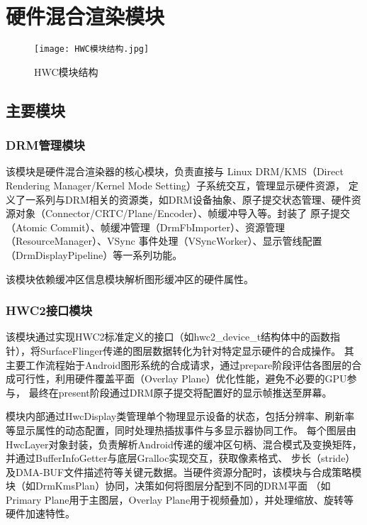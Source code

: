 \section{硬件混合渲染模块}

\begin{figure}[h]
  \centering
  \texttt{[image: HWC模块结构.jpg]}
  \caption{HWC模块结构}
  \label{fig:HWC模块结构}
\end{figure}

\subsection{主要模块}

\subsubsection{DRM管理模块}
该模块是硬件混合渲染器的核心模块，负责直接与 Linux DRM/KMS（Direct Rendering Manager/Kernel Mode Setting）子系统交互，管理显示硬件资源，
定义了一系列与DRM相关的资源类，如DRM设备抽象、原子提交状态管理、硬件资源对象（Connector/CRTC/Plane/Encoder）、帧缓冲导入等。封装了
原子提交（Atomic Commit）、帧缓冲管理（DrmFbImporter）、资源管理（ResourceManager）、VSync 事件处理（VSyncWorker）、显示管线配置（DrmDisplayPipeline）等一系列功能。

该模块依赖缓冲区信息模块解析图形缓冲区的硬件属性。

\subsubsection{HWC2接口模块}
该模块通过实现HWC2标准定义的接口（如hwc2\_device\_t结构体中的函数指针），将SurfaceFlinger传递的图层数据转化为针对特定显示硬件的合成操作。
其主要工作流程始于Android图形系统的合成请求，通过prepare阶段评估各图层的合成可行性，利用硬件覆盖平面（Overlay Plane）优化性能，避免不必要的GPU参与，
最终在present阶段通过DRM原子提交将配置好的显示帧推送至屏幕。

模块内部通过HwcDisplay类管理单个物理显示设备的状态，包括分辨率、刷新率等显示属性的动态配置，同时处理热插拔事件与多显示器协同工作。
每个图层由HwcLayer对象封装，负责解析Android传递的缓冲区句柄、混合模式及变换矩阵，并通过BufferInfoGetter与底层Gralloc实现交互，获取像素格式、
步长（stride）及DMA-BUF文件描述符等关键元数据。当硬件资源分配时，该模块与合成策略模块（如DrmKmsPlan）协同，决策如何将图层分配到不同的DRM平面
（如Primary Plane用于主图层，Overlay Plane用于视频叠加），并处理缩放、旋转等硬件加速特性。

